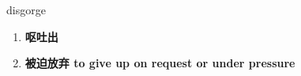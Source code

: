 
\begin{frame}
{\huge disgorge}
\begin{center}
\begin{enumerate}\Large
  \item \textbf{呕吐出}
  \item \textbf{被迫放弃 to give up on request or under pressure}
\end{enumerate}
\end{center}
\end{frame}
